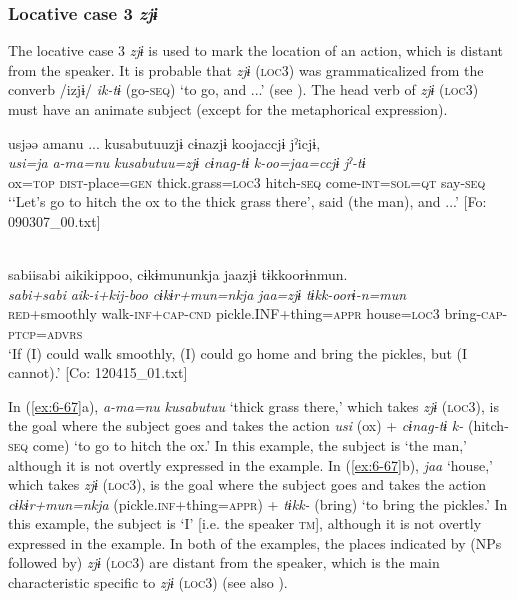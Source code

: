 \subsubsection{Locative case 3 \textit{zjɨ}}

The locative case 3 \textit{zjɨ} is used to mark the location of an action, which is distant from the speaker. It is probable that \textit{zjɨ} (\textsc{loc3}) was grammaticalized from the converb /izjɨ/ \textit{ik-tɨ} (go-\textsc{seq}) ‘to go, and ...’ (see ). The head verb of \textit{zjɨ} (\textsc{loc3}) must have an animate subject (except for the metaphorical expression).

\ea\label{ex:6-67}
\ea
{\TM}
\glll usjəə  amanu ...  kusabutuuzjɨ  cɨnazjɨ   koojaccjɨ  jˀicjɨ,\\
\textit{usi=ja}  \textit{a-ma=nu}  \textit{kusabutuu=zjɨ}  \textit{cɨnag-tɨ}   \textit{k-oo=jaa=ccjɨ}  \textit{jˀ-tɨ}\\
ox=\textsc{top}  \textsc{dist}-place=\textsc{gen}  thick.grass=\textsc{loc3}  hitch-\textsc{seq}    come-\textsc{int}=\textsc{sol}=\textsc{qt}  say-\textsc{seq}\\
\glt ‘‘Let’s go to hitch the ox to the thick grass there’, said (the man), and ...’ [Fo: 090307\_00.txt]

\ex\relax[= (\ref{ex:4-54}b)]\\
{\TM}
\glll  sabiisabi  aikikippoo,  cɨkɨmununkja  jaazjɨ   tɨkkoorɨnmun.\\
\textit{sabi+sabi}  \textit{aik-i+kij-boo}  \textit{cɨkɨr+mun=nkja}  \textit{jaa=zjɨ}    \textit{tɨkk-oorɨ-n=mun}\\
\textsc{red}+smoothly  walk-\textsc{inf}+\textsc{cap}-\textsc{cnd}  pickle.INF+thing=\textsc{appr}  house=\textsc{loc3} bring-\textsc{cap}-\textsc{ptcp}=\textsc{advrs}\\
\glt ‘If (I) could walk smoothly, (I) could go home and bring the pickles, but (I cannot).’ [Co: 120415\_01.txt]
\z
\z

In (\ref{ex:6-67}a), \textit{a-ma=nu} \textit{kusabutuu} ‘thick grass there,’ which takes \textit{zjɨ} (\textsc{loc3}), is the goal where the subject goes and takes the action \textit{usi} (ox) + \textit{cɨnag-tɨ} \textit{k-} (hitch-\textsc{seq} come) ‘to go to hitch the ox.’ In this example, the subject is ‘the man,’ although it is not overtly expressed in the example. In (\ref{ex:6-67}b), \textit{jaa} ‘house,’ which takes \textit{zjɨ} (\textsc{loc3}), is the goal where the subject goes and takes the action \textit{cɨkɨr+mun=nkja} (pickle.\textsc{inf}+thing=\textsc{appr}) + \textit{tɨkk-} (bring) ‘to bring the pickles.’ In this example, the subject is ‘I’ [i.e. the speaker \textsc{tm}], although it is not overtly expressed in the example. In both of the examples, the places indicated by (NPs followed by) \textit{zjɨ} (\textsc{loc3}) are distant from the speaker, which is the main characteristic specific to \textit{zjɨ} (\textsc{loc3}) (see also ).

